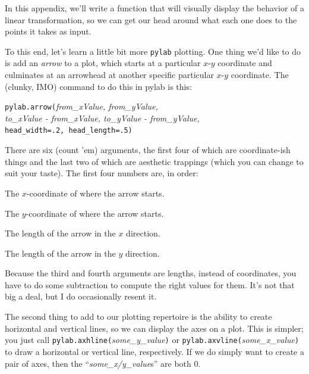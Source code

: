 In this appendix, we'll write a function that will visually display the
behavior of a linear transformation, so we can get our head around what each
one does to the points it takes as input.


To this end, let's learn a little bit more \texttt{pylab} plotting. One thing
we'd like to do is add an \textit{arrow} to a plot, which starts at a
particular $x$-$y$ coordinate and culminates at an arrowhead at another
specific particular $x$-$y$ coordinate. The (clunky, IMO) command to do this in
pylab is this:


\quad\quad\quad\texttt{pylab.arrow(}\textsl{from\_xValue, from\_yValue,}\\
\indent\quad\quad\quad\quad\quad \textsl{to\_xValue - from\_xValue, to\_yValue - from\_yValue,}\\
\indent\quad\quad\quad\quad\quad\texttt{head\_width=.2, head\_length=.5)}

There are six (count 'em) arguments, the first four of which are coordinate-ish
things and the last two of which are aesthetic trappings (which you can change
to suit your taste). The first four numbers are, in order:

\begin{compactenum}
\item The $x$-coordinate of where the arrow starts.
\item The $y$-coordinate of where the arrow starts.
\item The length of the arrow in the $x$ direction.
\item The length of the arrow in the $y$ direction.
\end{compactenum}

Because the third and fourth arguments are lengths, instead of coordinates, you
have to do some subtraction to compute the right values for them. It's not that
big a deal, but I do occasionally resent it.

\medskip

The second thing to add to our plotting repertoire is the ability to create
horizontal and vertical lines, so we can display the axes on a plot. This is
simpler; you just call \texttt{pylab.axhline(}\textsl{some\_y\_value}\texttt{)}
or \texttt{pylab.axvline(}\textsl{some\_x\_value}\texttt{)} to draw a
horizontal or vertical line, respectively. If we do simply want to create a
pair of axes, then the ``\textsl{some\_x/y\_value}s'' are both 0.

